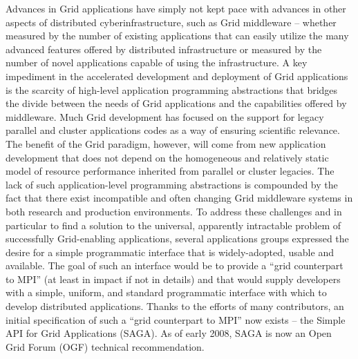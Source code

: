 \documentclass[a4paper,10pt]{article}
\begin{document}
Advances in Grid applications have simply not kept pace with advances in other aspects of distributed cyberinfrastructure, such as Grid middleware -- whether measured by the number of existing applications that can easily utilize the many advanced features offered by distributed infrastructure or measured by the number of novel applications capable of using the infrastructure. A key impediment in the accelerated development and deployment of Grid applications is the scarcity of high-level application programming abstractions that bridges the divide between the needs of Grid applications and the capabilities offered by middleware.  Much Grid development has focused on the support for legacy parallel and cluster applications codes as a way of ensuring scientific relevance.  The benefit of the Grid paradigm, however, will come from new application development that does not depend on the homogeneous and relatively static model of resource performance inherited from parallel or cluster legacies.  The lack of such application-level programming abstractions is compounded by the fact that there exist incompatible and often changing Grid middleware systems in both research and production environments.  To address these challenges and in particular to find a solution to the universal, apparently intractable problem of successfully Grid-enabling applications, several applications groups expressed the desire for a simple programmatic interface that is widely-adopted, usable and available.  The goal of such an interface would be to provide a ``grid counterpart to MPI'' (at least in impact if not in details) and that would supply developers with a simple, uniform, and standard programmatic interface with which to develop distributed applications.  Thanks to the efforts of many contributors, an initial specification of such a ``grid counterpart to MPI'' now exists -- the Simple API for Grid Applications (SAGA). As of early 2008, SAGA is now an Open Grid Forum (OGF) technical recommendation.


\end{document}

